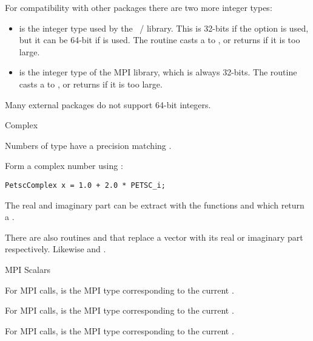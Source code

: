 For compatibility with other packages there are two more integer types:
%
%
\begin{itemize}
\item {} is the integer type used by the
  ~/  library. This is 32-bits if the
   option is used, but it can be 64-bit if
   is used.
  The routine  casts a
   to , or returns
   if it is too large.
\item {} is the integer type of the MPI library, which is
  always 32-bits.
  The routine  casts a
   to , or returns
   if it is too large.
\end{itemize}
Many external packages do not support 64-bit integers.

 {Complex}

Numbers of type  have a precision
matching .

Form a complex number using :
\begin{lstlisting}
PetscComplex x = 1.0 + 2.0 * PETSC_i;
\end{lstlisting}

The real and imaginary part can be extract with the functions
 and 
which return a .

There are also routines 
and  that replace a vector
with its real or imaginary part respectively.
Likewise  and .

 {MPI Scalars}

For MPI calls,  is the MPI type
corresponding to the current .

For MPI calls,  is the MPI type
corresponding to the current .

For MPI calls,  is the MPI type
corresponding to the current .


